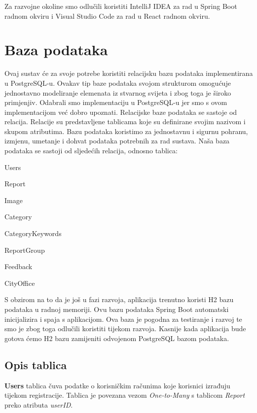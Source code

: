 		Za razvojne okoline smo odlučili koristiti IntelliJ IDEA za rad u Spring Boot radnom okviru i Visual Studio Code za rad u React radnom okviru.
		
	\eject
	
		\section{Baza podataka}
		\label{sec:bazaPodataka}
		
		Ovaj sustav će za svoje potrebe koristiti relacijsku bazu podataka implementirana u PostgreSQL-u. Ovakav tip baze podataka svojom strukturom omogućuje jednostavno modeliranje elemenata iz stvarnog svijeta i zbog toga je široko primjenjiv. Odabrali smo implementaciju u PostgreSQL-u jer smo s ovom implementacijom već dobro upoznati. Relacijske baze podataka se sastoje od relacija. Relacije su predstavljene tablicama koje su definirane svojim nazivom i skupom atributima. Bazu podataka koristimo za jednostavnu i sigurnu pohranu, izmjenu, umetanje i dohvat podataka potrebnih za rad sustava. Naša baza podataka se sastoji od sljedećih relacija, odnosno tablica:
		
		\begin{packed_item}
			\item Users
			\item Report
			\item Image
			\item Category
			\item CategoryKeywords
			\item ReportGroup 
			\item Feedback
			\item CityOffice
		\end{packed_item}
		
		S obzirom na to da je još u fazi razvoja, aplikacija trenutno koristi H2 bazu podataka u radnoj memoriji. Ovu bazu podataka Spring Boot automatski inicijalizira i spaja s aplikacijom. Ova baza je pogodna za testiranje i razvoj te smo je zbog toga odlučili koristiti tijekom razvoja. Kasnije kada aplikacija bude gotova ćemo H2 bazu zamijeniti odvojenom PostgreSQL bazom podataka.
		
			\subsection{Opis tablica}
			
			\textbf{Users} tablica čuva podatke o korisničkim računima koje korisnici izrađuju tijekom registracije. Tablica je povezana vezom \textit{One-to-Many} s tablicom \textit{Report} preko atributa \textit{userID}.
			
